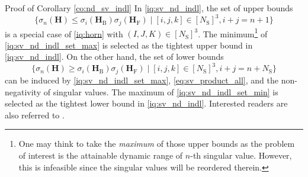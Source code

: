 \documentclass[journal]{IEEEtran}
\begin{document}
\begin{appendix}
	\begin{subsection}{Proof of Corollary \ref{co:nd_sv_indl}}
		\label{ap:nd_sv_indl}
		In \eqref{iq:sv_nd_indl}, the set of upper bounds
		\begin{equation}
			\label{iq:sv_nd_indl_set_max}
			\bigl\{\sigma_n(\mathbf{H}) \le \sigma_i(\mathbf{H}_\mathrm{B}) \sigma_j(\mathbf{H}_\mathrm{F}) \mid [i,j,k] \in [N_\mathrm{S}]^3, i+j=n+1\bigr\}
		\end{equation}
		is a special case of \eqref{iq:horn} with $(I, J, K) \in [N_\mathrm{S}]^3$.
		The minimum\footnote{One may think to take the \emph{maximum} of those upper bounds as the problem of interest is the attainable dynamic range of $n$-th singular value. However, this is infeasible since the singular values will be reordered therein.} of \eqref{iq:sv_nd_indl_set_max} is selected as the tightest upper bound in \eqref{iq:sv_nd_indl}.
		On the other hand, the set of lower bounds
		\begin{equation}
			\label{iq:sv_nd_indl_set_min}
			\bigl\{\sigma_n(\mathbf{H}) \ge \sigma_i(\mathbf{H}_\mathrm{B}) \sigma_j(\mathbf{H}_\mathrm{F}) \mid [i,j,k] \in [N_\mathrm{S}]^3, i+j=n+N_\mathrm{S}\bigr\}
		\end{equation}
		can be induced by \eqref{iq:sv_nd_indl_set_max}, \eqref{eq:sv_product_all}, and the non-negativity of singular values.
		The maximum of \eqref{iq:sv_nd_indl_set_min} is selected as the tightest lower bound in \eqref{iq:sv_nd_indl}.
		Interested readers are also referred to \cite[(2.0.3)]{Zhang2005}.


\end{subsection}
\end{appendix}
\end{document}
